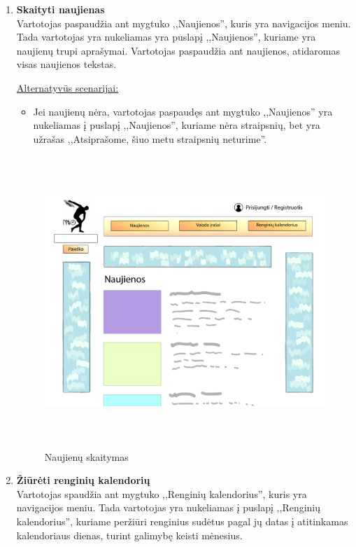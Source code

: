 \documentclass{VUMIFPSkursinis}
\begin{document}
		\begin{enumerate} [label = \textbf{U\arabic*.}]
			\item \textbf{Skaityti naujienas} \\
				Vartotojas paspaudžia ant mygtuko ,,Naujienos'', kuris yra navigacijos meniu. Tada vartotojas yra nukeliamas yra puslapį ,,Naujienos'', kuriame yra naujienų trupi aprašymai. Vartotojas paspaudžia ant naujienos, atidaromas visas naujienos tekstas.
				
				\underline{Alternatyvūs scenarijai:}
				\begin{itemize}
					\item Jei naujienų nėra, vartotojas paspaudęs ant mygtuko ,,Naujienos'' yra nukeliamas į puslapį ,,Naujienos'', kuriame nėra straipsnių, bet yra užrašas ,,Atsiprašome, šiuo metu straipsnių neturime''. 
				\end{itemize}

				\begin{figure}[H]
					\centering
					\includegraphics[width=\textwidth, height=11cm, keepaspectratio]{img/PSI4/Naujienos-01.jpg}
					\caption{Naujienų skaitymas}
					\label{fig:uzd_skaitymas}
				\end{figure}
				
			\item \textbf{Žiūrėti renginių kalendorių} \\
				Vartotojas spaudžia ant mygtuko ,,Renginių kalendorius'', kuris yra navigacijos meniu. Tada vartotojas yra nukeliamas į puslapį ,,Renginių kalendorius'', kuriame peržiūri renginius sudėtus pagal jų datas į atitinkamas kalendoriaus dienas, turint galimybę keisti mėnesius.
				

\end{enumerate}
\end{document}
